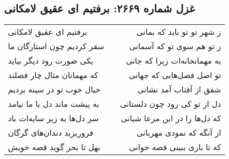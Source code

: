 \begin{center}
\section*{غزل شماره ۲۶۶۹: برفتیم ای عقیق لامکانی}
\label{sec:2669}
\begin{longtable}{l p{0.5cm} r}
برفتیم ای عقیق لامکانی
&&
ز شهر تو تو باید که بمانی
\\
سفر کردیم چون استارگان ما
&&
ز تو هم سوی تو که آسمانی
\\
یکی صورت رود دیگر بیاید
&&
به مهمانخانه‌ات زیرا که جانی
\\
که مهمانان مثال چار فصلند
&&
تو اصل فصل‌هایی که جهانی
\\
خیال خوب تو در سینه بردیم
&&
شفق از آفتاب آمد نشانی
\\
به پیشت ماند دل با ما نیامد
&&
دل از تو کی رود چون دلستانی
\\
سر دل‌ها به زیر سایه‌ات باد
&&
که دل‌ها را در این مرعا شبانی
\\
فروریزید دندان‌های گرگان
&&
از آنگه که نمودی مهربانی
\\
بهل تا بحر گوید قصه خویش
&&
که تا باری ببینی قصه خوانی
\\
\end{longtable}
\end{center}

